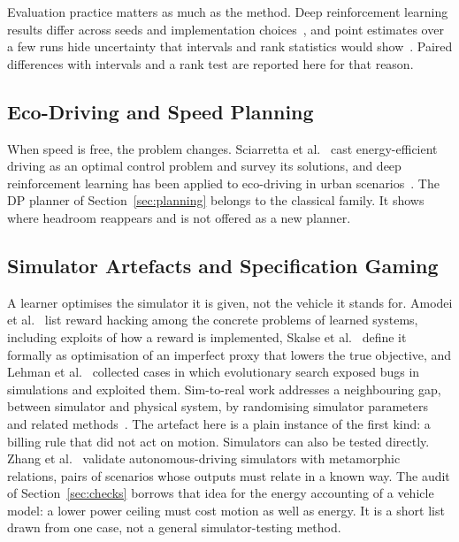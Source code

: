 \documentclass{ieeeaccess}
\begin{document}
Evaluation practice matters as much as the method. Deep reinforcement learning results differ across seeds and implementation choices~\cite{henderson2018}, and point estimates over a few runs hide uncertainty that intervals and rank statistics would show~\cite{agarwal2021}. Paired differences with intervals and a rank test are reported here for that reason.

\subsection{Eco-Driving and Speed Planning}

When speed is free, the problem changes. Sciarretta et al.~\cite{sciarretta2015} cast energy-efficient driving as an optimal control problem and survey its solutions, and deep reinforcement learning has been applied to eco-driving in urban scenarios~\cite{wegener2021}. The DP planner of Section~\ref{sec:planning} belongs to the classical family. It shows where headroom reappears and is not offered as a new planner.

\subsection{Simulator Artefacts and Specification Gaming}

A learner optimises the simulator it is given, not the vehicle it stands for. Amodei et al.~\cite{amodei2016} list reward hacking among the concrete problems of learned systems, including exploits of how a reward is implemented, Skalse et al.~\cite{skalse2022} define it formally as optimisation of an imperfect proxy that lowers the true objective, and Lehman et al.~\cite{lehman2020} collected cases in which evolutionary search exposed bugs in simulations and exploited them. Sim-to-real work addresses a neighbouring gap, between simulator and physical system, by randomising simulator parameters~\cite{tobin2017} and related methods~\cite{zhao2020}. The artefact here is a plain instance of the first kind: a billing rule that did not act on motion. Simulators can also be tested directly. Zhang et al.~\cite{zhang2024mt} validate autonomous-driving simulators with metamorphic relations, pairs of scenarios whose outputs must relate in a known way. The audit of Section~\ref{sec:checks} borrows that idea for the energy accounting of a vehicle model: a lower power ceiling must cost motion as well as energy. It is a short list drawn from one case, not a general simulator-testing method.
\end{document}
